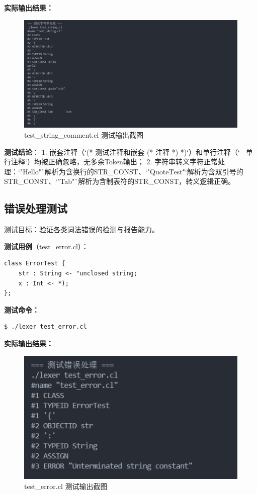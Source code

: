 \documentclass[twocolumn]{article}
\begin{document}
\textbf{实际输出结果：}
\begin{figure}[H]
    \centering
    \includegraphics[width=0.95\linewidth]{test_string_comment.png}  %
    \caption{test_string_comment.cl 测试输出截图}  %
\end{figure}

\textbf{测试结论}：
1. 嵌套注释（`(* 测试注释和嵌套 (* 注释 *) *)`）和单行注释（`-- 单行注释`）均被正确忽略，无多余Token输出；
2. 字符串转义字符正常处理：`"Hello\nWorld"`解析为含换行的STR_CONST、`"Quote\"Test\""`解析为含双引号的STR_CONST、`"Tab\tTest"`解析为含制表符的STR_CONST，转义逻辑正确。

\subsection{错误处理测试}

测试目标：验证各类词法错误的检测与报告能力。

\textbf{测试用例}（test_error.cl）：
\begin{lstlisting}[language=cool, caption={错误处理测试}]
class ErrorTest {
    str : String <- "unclosed string;
    x : Int <- *);
};
\end{lstlisting}

\textbf{测试命令：}
\begin{verbatim}
$ ./lexer test_error.cl
\end{verbatim}

\textbf{实际输出结果：}
\begin{figure}[H]
    \centering
    \includegraphics[width=0.95\linewidth]{test_error.png}  %
    \caption{test_error.cl 测试输出截图}  %
\end{figure}
\end{document}
